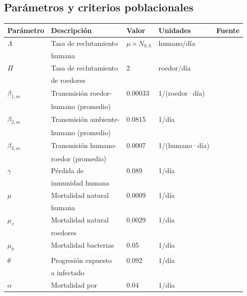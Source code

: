 \documentclass[12pt,a4paper]{article}
\begin{document}
\subsection{Parámetros y criterios poblacionales}
\begin{table}[H]
\centering
\begin{tabular}{@{}lllll@{}}
\toprule
\textbf{Parámetro} & \textbf{Descripción} & \textbf{Valor} & \textbf{Unidades} & \textbf{Fuente} \\
\midrule
$\Lambda$ & Tasa de reclutamiento  
           & $\mu \times N_{0,h}$ & humano/día & \cite{paisanwarakiat2021} \\
          & humana &  &  &  \\
$\Pi$ & Tasa de reclutamiento  
      & 2 & roedor/día & \cite{paisanwarakiat2021} \\
      & de roedores  &  &  &  \\
$\beta_{1,m}$ & Transmisión roedor- 
              & 0.00033 & 1/(roedor·día) & \cite{engida2022} \\
              & humano (promedio) &  &  &  \\
$\beta_{2,m}$ & Transmisión ambiente-
              & 0.0815 & 1/día & \cite{engida2022} \\
              & humano (promedio)  &  &  &  \\
$\beta_{3,m}$ & Transmisión humano-
              & 0.0007 & 1/(humano·día) & \cite{engida2022} \\
              & roedor (promedio)  &  &  &  \\
$\gamma$ & Pérdida de  
         & 0.089 & 1/día & \cite{khan2014} \\
         & inmunidad humana &  &  &  \\
$\mu$ & Mortalidad natural 
      & 0.0009 & 1/día & \cite{alemneh2020,paisanwarakiat2021} \\
      & humana  &  &  &  \\
$\mu_v$ & Mortalidad natural 
        & 0.0029 & 1/día & \cite{alemneh2020} \\
        & roedores  &  &  &  \\
$\mu_b$ & Mortalidad bacterias 
        & 0.05 & 1/día & \cite{minter2019} \\
        &  &  &  &  \\
$\theta$ & Progresión expuesto
         & 0.092 & 1/día & \cite{khan2012} \\
         &  a infectado  &  &  &  \\
$\alpha$ & Mortalidad por 
         & 0.04 & 1/día & \cite{engida2022} \\

\end{tabular}
\end{table}
\end{document}
